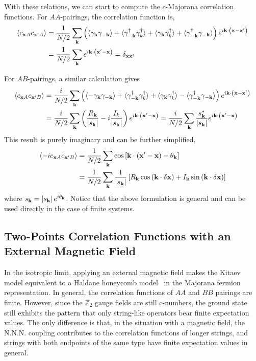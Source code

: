 With these relations, we can start to compute the $c$-Majorana correlation functions. For $AA$-pairings, the correlation function is,
\begin{align*}
  \langle c_{\mathbf{x}A}c_{\mathbf{x}'A} \rangle &= \frac{1}{N/2}\sum_{\mathbf{k}}\left(  \langle \gamma_{\mathbf{k}}\gamma_{-\mathbf{k}} \rangle + \langle \gamma_{-\mathbf{k}}^\dagger\gamma^\dagger_{k} \rangle +
  \langle \gamma_{\mathbf{k}}\gamma_{k}^\dagger \rangle + 
  \langle \gamma_{-\mathbf{k}}^\dagger\gamma_{-\mathbf{k}} \rangle
   \right)e^{i\mathbf{k}\cdot\left( \mathbf{x}-\mathbf{x'} \right)} \\
  &= \frac{1}{N/2}\sum_{\mathbf{k}} e^{i\mathbf{k}\cdot\left( \mathbf{x}'-\mathbf{x} \right)} = \delta_{\mathbf{x}\mathbf{x}'}
\end{align*}

For $AB$-pairings, a similar calculation gives
\begin{align*}
  \langle c_{\mathbf{x}A}c_{\mathbf{x}'B} \rangle &= \frac{i}{N/2}\sum_{\mathbf{k}}\left(  \langle -\gamma_{\mathbf{k}}\gamma_{-\mathbf{k}} \rangle + \langle \gamma_{-\mathbf{k}}^\dagger\gamma^\dagger_{k} \rangle +
  \langle \gamma_{\mathbf{k}}\gamma_{k}^\dagger \rangle - 
  \langle \gamma_{-\mathbf{k}}^\dagger\gamma_{-\mathbf{k}} \rangle
   \right)e^{i\mathbf{k}\cdot\left( \mathbf{x}-\mathbf{x'} \right)} \\
  &= \frac{i}{N/2}\sum_{\mathbf{k}}\left( \frac{R_{\mathbf{k}}}{\left| s_{\mathbf{k}} \right|} - i\frac{I_k}{\left| s_{\mathbf{k}} \right|} \right)e^{i\mathbf{k}\cdot\left( \mathbf{x}'-\mathbf{x} \right)} 
  = \frac{i}{N/2}\sum_{\mathbf{k}}\frac{s^*_{\mathbf{k}}}{\left| s_{\mathbf{k}} \right|}e^{i\mathbf{k}\cdot\left( \mathbf{x}'-\mathbf{x} \right)} 
\end{align*}
This result is purely imaginary and can be further simplified,
\begin{align}\label{eq:correlationAB}
  \langle -ic_{\mathbf{x}A}c_{\mathbf{x}'B} \rangle 
  &= 
  \frac{1}{N/2}\sum_{\mathbf{k}}\cos\left[ \mathbf{k}\cdot\left( \mathbf{x}'-\mathbf{x} \right) - \theta_{\mathbf{k}} \right] \nonumber \\
  &= 
  \frac{1}{N/2}
  \sum_{\mathbf{k}}
  \frac{1}{\left| s_{\mathbf{k}} \right|}\left[ R_{\mathbf{k}} \cos\left( \mathbf{k} \cdot \delta\mathbf{x} \right) + I_{\mathbf{k}}\sin\left( \mathbf{k}\cdot\delta\mathbf{x} \right)  \right]
\end{align}
where $s_{\mathbf{k}} = \left| s_{\mathbf{k}} \right|e^{i\theta_{\mathbf{k}}}$. Notice that the above formulation is general and can be used directly in the case of finite systems.

\subsection{Two-Points Correlation Functions with an External Magnetic Field}
In the isotropic limit, applying an external magnetic field makes the Kitaev model equivalent to a Haldane honeycomb model~\cite{Haldane_1988} in the Majorana fermion representation. In general, the correlation functions of $AA$ and $BB$ pairings are finite. However, since the $\mathbb{Z}_2$ gauge fields are still c-numbers, the ground state still exhibits the pattern that only string-like operators bear finite expectation values. The only difference is that, in the situation with a magnetic field, the N.N.N. coupling contributes to the correlation functions of longer strings, and strings with both endpoints of the same type have finite expectation values in general. 

